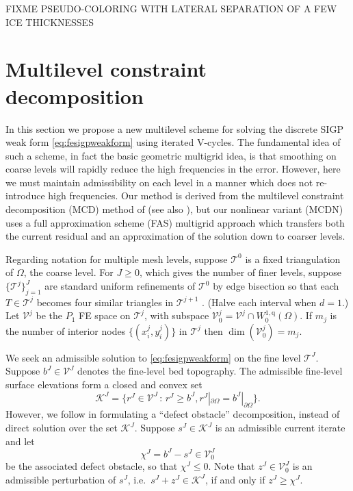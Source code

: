 \documentclass[letterpaper,final,12pt,reqno]{amsart}
\theoremstyle{claim}
\newcommand{\qq}{{\text{q}}}
\numberwithin{equation}{section}
\numberwithin{figure}{section}
\numberwithin{table}{section}
\numberwithin{theorem}{section}
\begin{document}
FIXME PSEUDO-COLORING WITH LATERAL SEPARATION OF A FEW ICE THICKNESSES


\section{Multilevel constraint decomposition} \label{sec:mcdstokes}

In this section we propose a new multilevel scheme for solving the discrete SIGP weak form \eqref{eq:fesigpweakform} using iterated V-cycles.  The fundamental idea of such a scheme, in fact the basic geometric multigrid idea, is that smoothing on coarse levels will rapidly reduce the high frequencies in the error.  However, here we must maintain admissibility on each level in a manner which does not re-introduce high frequencies.  Our method is derived from the multilevel constraint decomposition (MCD) method of \cite{Tai2003} (see also \cite{GraeserKornhuber2009}), but our nonlinear variant (MCDN) uses a full approximation scheme (FAS) multigrid \cite{Trottenbergetal2001} approach which transfers both the current residual and an approximation of the solution down to coarser levels.

Regarding notation for multiple mesh levels, suppose $\mathcal{T}^0$ is a fixed triangulation of $\Omega$, the coarse level.  For $J\ge 0$, which gives the number of finer levels, suppose $\{\mathcal{T}^j\}_{j=1}^J$ are standard uniform refinements of $\mathcal{T}^0$ by edge bisection so that each $T \in \mathcal{T}^j$ becomes four similar triangles in $\mathcal{T}^{j+1}$ \cite{Braess2007}.  (Halve each interval when $d=1$.)  Let $\mathcal{V}^j$ be the $P_1$ FE space on $\mathcal{T}^j$, with subspace $\mathcal{V}_0^j = \mathcal{V}^j \cap W_0^{1,\qq}(\Omega)$.  If $m_j$ is the number of interior nodes $\{(x_i^j,y_i^j)\}$ in $\mathcal{T}^j$ then $\dim(\mathcal{V}_0^j)=m_j$.

We seek an admissible solution to \eqref{eq:fesigpweakform} on the fine level $\mathcal{T}^J$.  Suppose $b^J \in \mathcal{V}^J$ denotes the fine-level bed topography.  The admissible fine-level surface elevations form a closed and convex set
\begin{equation}
\mathcal{K}^J = \{r^J \in \mathcal{V}^J \,:\, r^J \ge b^J, r^J|_{\partial\Omega} = b^J|_{\partial\Omega}\}.  \label{eq:singleadmissible}
\end{equation}
However, we follow \cite{GraeserKornhuber2009} in formulating a ``defect obstacle'' decomposition, instead of direct solution over the set $\mathcal{K}^J$.  Suppose $s^J \in \mathcal{K}^J$ is an admissible current iterate and let
\begin{equation}
\chi^J = b^J - s^J \in \mathcal{V}_0^J \label{eq:finedefectobstacle}
\end{equation}
be the associated defect obstacle, so that $\chi^J \le 0$.  Note that $z^J \in \mathcal{V}_0^J$ is an admissible perturbation of $s^J$, i.e.~$s^J+z^J \in \mathcal{K}^J$, if and only if $z^J \ge \chi^J$.
\end{document}
